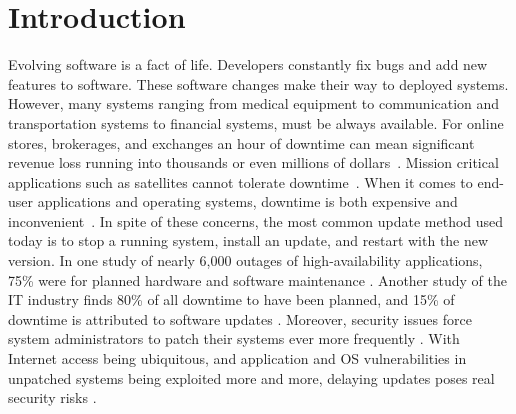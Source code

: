 
\chapter{Introduction}

Evolving software is a fact of life. Developers constantly fix bugs and add
new features to software. These software changes
make their way to deployed systems. However, many systems ranging
from medical equipment to communication and transportation systems to
financial systems, must be always available. For online stores, brokerages,
and exchanges an hour of downtime can mean significant revenue loss running
into thousands or even millions of dollars~\cite{gartner98downtime, roc1,
eagle-rock, parker}. Mission critical applications such as satellites
cannot tolerate downtime~\cite{french-satellite}. When it comes to
end-user applications and operating systems, downtime is both expensive
and inconvenient~\cite{zorn05}. In spite of these concerns, the most common
update method used today is to stop a running system, install an update, and
restart with the new version. In one study of nearly 6,000 outages of
high-availability applications, 75\% were for planned hardware and software
maintenance \cite{lowell:04}. Another study of the IT industry finds 80\%
of all downtime to have been planned, and 15\% of downtime is attributed to
software updates \cite{vs-downtime}. Moreover, security issues force system
administrators to patch their systems ever more frequently \cite{vista}.
With Internet access being ubiquitous, and application and OS
vulnerabilities in unpatched systems being exploited more and more,
delaying updates poses real security risks \cite{altekar05opus, ksplice,
survival-time}.

